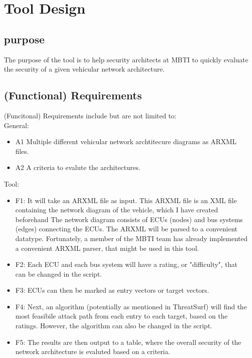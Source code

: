 \chapter{Tool Design}
\label{chp:design}

\section{purpose}\label{chp:purpose}

The purpose of the tool is to help security architects at MBTI to quickly evaluate 
the security of a given vehicular network architecture.

\section{(Functional) Requirements}\label{funct-req}

(Funcitonal) Requirements include but are not limited to:\\

General:

\begin{itemize}
	\item A1\label{sec:a1} Multiple different vehicular network archtitecure diagrams as ARXML files.
	\item A2\label{sec:a2} A criteria to evalute the architectures.
\end{itemize}

Tool:

\begin{itemize}

	\item F1\label{sec:f1}: It will take an ARXML file as input. 
		This ARXML file is an XML file containing the network diagram of the vehicle, which I have created beforehand
		The network diagram consists of ECUs (nodes) and bus systems (edges) connecting the ECUs.
		The ARXML will be parsed to a convenient datatype.
		Fortunately, a member of the MBTI team has already implemented a convenient ARXML parser, that might be used in this tool.

\item F2\label{sec:f2}: Each ECU and each bus system will have a rating, or "difficulty", that can be changed in the script.
\item F3\label{sec:f3}: ECUs can then be marked as entry vectors or target vectors.

\item F4\label{sec:f4}: Next, an algorithm (potentially as mentioned in ThreatSurf\cite{threat_surf}) will find the most feasibile attack path from each entry to each target, 
		based on the ratings.
		However, the algorithm can also be changed in the script.

\item F5\label{sec:f5}: The results are then output to a table, 
		where the overall security of the network architecture is evaluted based on a criteria.

\end{itemize}

